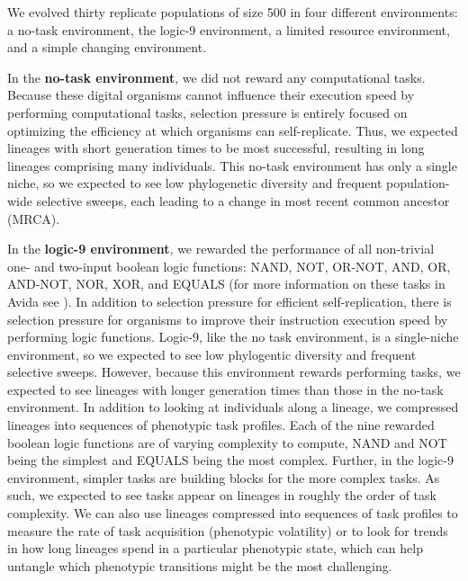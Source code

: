 \documentclass[letterpaper]{article}
\begin{document}
We evolved thirty replicate populations of size 500 in four different environments: a no-task environment, the logic-9 environment, a limited resource environment, and a simple changing environment. %


In the \textbf{no-task environment}, we did not reward any computational tasks. Because these digital organisms cannot influence their execution speed by performing computational tasks, selection pressure is entirely focused on optimizing the efficiency at which organisms can self-replicate. 
Thus, we expected lineages with short generation times to be most successful, resulting in long lineages comprising many individuals. This no-task environment has only a single niche, so we expected to see low phylogenetic diversity and frequent population-wide selective sweeps, each leading to a change in most recent common ancestor (MRCA).


In the \textbf{logic-9 environment}, we rewarded the performance of all non-trivial one- and two-input boolean logic functions: NAND, NOT, OR-NOT, AND, OR, AND-NOT, NOR, XOR, and EQUALS (for more information on these tasks in Avida see \citep{lenski_evolutionary_2003}). In addition to selection pressure for efficient self-replication, there is selection pressure for organisms to improve their instruction execution speed by performing logic functions. 
Logic-9, like the no task environment, is a single-niche environment, so we expected to see low phylogentic diversity and frequent selective sweeps. However, because this environment rewards performing tasks, we expected to see lineages with longer generation times than those in the no-task environment. 
In addition to looking at individuals along a lineage, we compressed lineages into sequences of phenotypic task profiles. Each of the nine rewarded boolean logic functions are of varying complexity to compute, NAND and NOT being the simplest and EQUALS being the most complex. Further, in the logic-9 environment, simpler tasks are building blocks for the more complex tasks. 
As such, we expected to see tasks appear on lineages in roughly the order of task complexity.
We can also use lineages compressed into sequences of task profiles to measure the rate of task acquisition (phenotypic volatility) or to look for trends in how long lineages spend in a particular phenotypic state, which can help untangle which phenotypic transitions might be the most challenging.
\end{document}

